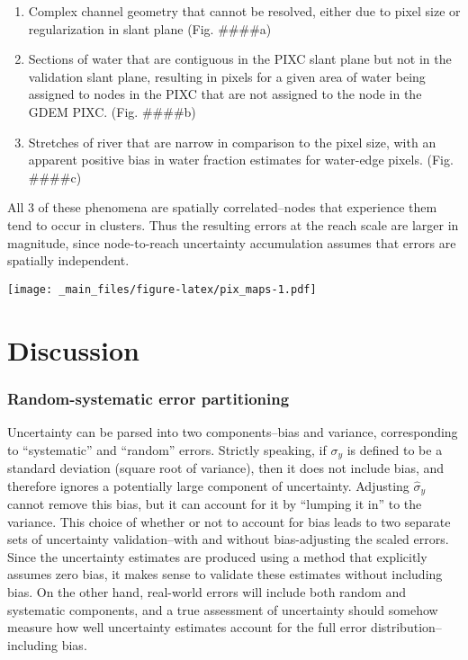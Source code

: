 \documentclass[]{book}
\providecommand{\tightlist}{%
  \setlength{\itemsep}{0pt}\setlength{\parskip}{0pt}}
\begin{document}
\begin{enumerate}
\def\labelenumi{\arabic{enumi}.}
\tightlist
\item
  Complex channel geometry that cannot be resolved, either due to pixel size or regularization in slant plane (Fig. \#\#\#\#a)
\item
  Sections of water that are contiguous in the PIXC slant plane but not in the validation slant plane, resulting in pixels for a given area of water being assigned to nodes in the PIXC that are not assigned to the node in the GDEM PIXC. (Fig. \#\#\#\#b)
\item
  Stretches of river that are narrow in comparison to the pixel size, with an apparent positive bias in water fraction estimates for water-edge pixels. (Fig. \#\#\#\#c)
\end{enumerate}

All 3 of these phenomena are spatially correlated--nodes that experience them tend to occur in clusters. Thus the resulting errors at the reach scale are larger in magnitude, since node-to-reach uncertainty accumulation assumes that errors are spatially independent.

\texttt{[image: \_main\_files/figure-latex/pix\_maps-1.pdf]}

\hypertarget{discussion}{%
\chapter{Discussion}\label{discussion}}

\hypertarget{random-systematic-error-partitioning}{%
\subsection{Random-systematic error partitioning}\label{random-systematic-error-partitioning}}

Uncertainty can be parsed into two components--bias and variance, corresponding to ``systematic'' and ``random'' errors. Strictly speaking, if \(\sigma_y\) is defined to be a standard deviation (square root of variance), then it does not include bias, and therefore ignores a potentially large component of uncertainty. Adjusting \(\hat{\sigma}_y\) cannot remove this bias, but it can account for it by ``lumping it in'' to the variance. This choice of whether or not to account for bias leads to two separate sets of uncertainty validation--with and without bias-adjusting the scaled errors. Since the uncertainty estimates are produced using a method that explicitly assumes zero bias, it makes sense to validate these estimates without including bias. On the other hand, real-world errors will include both random and systematic components, and a true assessment of uncertainty should somehow measure how well uncertainty estimates account for the full error distribution--including bias.
\end{document}
